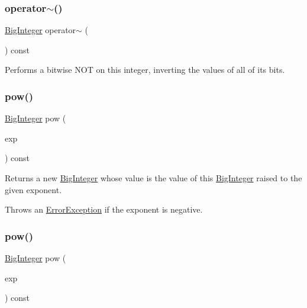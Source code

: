 \subsubsection{\texorpdfstring{operator$\sim$()}{operator~()}}
{\footnotesize\ttfamily \mbox{\hyperlink{classBigInteger}{Big\+Integer}} operator$\sim$ (\begin{DoxyParamCaption}{ }\end{DoxyParamCaption}) const}



Performs a bitwise N\+OT on this integer, inverting the values of all of its bits. 

\mbox{\label{classBigInteger_a2679d1fe9cb5daed464a9ab0783e2825}} 
\subsubsection{\texorpdfstring{pow()}{pow()}\hspace{0.1cm}{\footnotesize\ttfamily [1/2]}}
{\footnotesize\ttfamily \mbox{\hyperlink{classBigInteger}{Big\+Integer}} pow (\begin{DoxyParamCaption}\item[{long}]{exp }\end{DoxyParamCaption}) const}



Returns a new \mbox{\hyperlink{classBigInteger}{Big\+Integer}} whose value is the value of this \mbox{\hyperlink{classBigInteger}{Big\+Integer}} raised to the given exponent. 

Throws an \mbox{\hyperlink{classErrorException}{Error\+Exception}} if the exponent is negative. \mbox{\label{classBigInteger_af004e9189931255ce5d71f55d4ab4976}} 
\subsubsection{\texorpdfstring{pow()}{pow()}\hspace{0.1cm}{\footnotesize\ttfamily [2/2]}}
{\footnotesize\ttfamily \mbox{\hyperlink{classBigInteger}{Big\+Integer}} pow (\begin{DoxyParamCaption}\item[{const \mbox{\hyperlink{classBigInteger}{Big\+Integer}} \&}]{exp }\end{DoxyParamCaption}) const}



